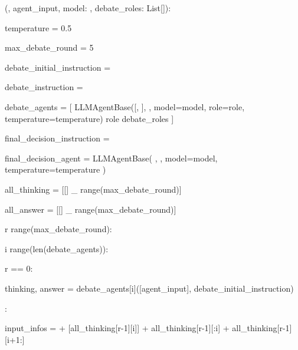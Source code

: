 \begin{subagent}[title={DebateAgent}]
  (, agent\_input, model: , debate\_roles: List[]):

\quad {}

\quad temperature = 0.5

\quad max\_debate\_round = 5

\quad {}

\quad debate\_initial\_instruction = 
\quad {}

\quad {}

\quad debate\_instruction = 
\quad {}

\quad {}

\quad debate\_agents = [
\quad\quad LLMAgentBase([, ],
\quad\quad {},
\quad\quad model=model,
\quad\quad role=role,
\quad\quad temperature=temperature)
\quad\quad {} role  debate\_roles
\quad ]

\quad {}

\quad final\_decision\_instruction =
\quad {}

\quad final\_decision\_agent = LLMAgentBase(
\quad{},
\quad\quad {},
\quad\quad model=model,
\quad\quad temperature=temperature
\quad )

\quad all\_thinking = [[]  \_  range(max\_debate\_round)]

\quad all\_answer = [[]  \_  range(max\_debate\_round)]

\quad {}

\quad {} r  range(max\_debate\_round):

\quad\quad {} i  range(len(debate\_agents)):

\quad\quad\quad {} r == 0:

\quad\quad\quad\quad thinking, answer = 
\quad\quad\quad\quad {} debate\_agents[i]([agent\_input], debate\_initial\_instruction)

\quad\quad\quad {}:

\quad\quad\quad\quad input\_infos = 
\quad\quad\quad{} 
\quad\quad\quad\quad + [all\_thinking[r-1][i]] 
\quad\quad\quad\quad + all\_thinking[r-1][:i] 
\quad\quad\quad\quad + all\_thinking[r-1][i+1:]


\end{subagent}
